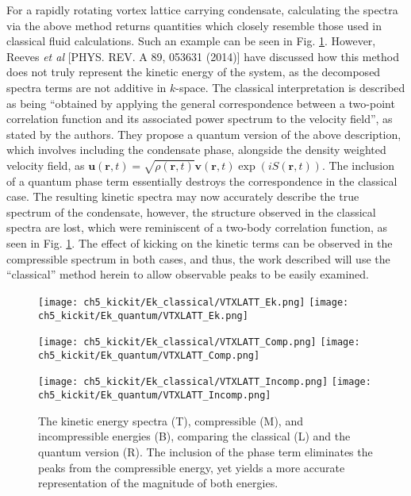 For a rapidly rotating vortex lattice carrying condensate, calculating the spectra via the above method returns quantities which closely resemble those used in classical fluid calculations. Such an example can be seen in Fig. \ref{fig:ek_clvqu}. However, Reeves {\it et al} [PHYS. REV. A 89, 053631 (2014)] have discussed how this method does not truly represent the kinetic energy of the system, as the decomposed spectra terms are not additive in $k$-space. The classical interpretation is described as being ``obtained by applying the general correspondence between a two-point correlation function and its associated
power spectrum to the velocity field'', as stated by the authors. They propose a quantum version of the above description, which involves including the condensate phase, alongside the density weighted velocity field, as $\mathbf{u}(\mathbf{r},t) = \sqrt{\rho(\mathbf{r},t)}\mathbf{v}(\mathbf{r},t)\exp\left(iS(\mathbf{r},t)\right)$. The inclusion of a quantum phase term essentially destroys the correspondence in the classical case. The resulting kinetic spectra may now accurately describe the true spectrum of the condensate, however, the structure observed in the classical spectra are lost, which were reminiscent of a two-body correlation function, as seen in Fig. \ref{fig:ek_clvqu}. The effect of kicking on the kinetic terms can be observed in the compressible spectrum in both cases, and thus, the work described will use the ``classical'' method herein to allow observable peaks to be easily examined.

\begin{figure}[tb]
    \centering
    \texttt{[image: ch5\_kickit/Ek\_classical/VTXLATT\_Ek.png]}
    \texttt{[image: ch5\_kickit/Ek\_quantum/VTXLATT\_Ek.png]}

    \texttt{[image: ch5\_kickit/Ek\_classical/VTXLATT\_Comp.png]}
    \texttt{[image: ch5\_kickit/Ek\_quantum/VTXLATT\_Comp.png]}

    \texttt{[image: ch5\_kickit/Ek\_classical/VTXLATT\_Incomp.png]}
    \texttt{[image: ch5\_kickit/Ek\_quantum/VTXLATT\_Incomp.png]}

\caption[Kinetic energy spectra with and without quantum phase.]{The kinetic energy spectra (T), compressible (M), and incompressible energies (B), comparing the classical (L) and the quantum version (R). The inclusion of the phase term eliminates the peaks from the compressible energy, yet yields a more accurate representation of the magnitude of both energies.}
\label{fig:ek_clvqu}
\end{figure}


